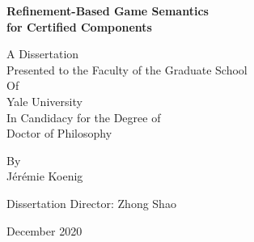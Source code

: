 \documentclass[11pt,oneside]{book}
\theoremstyle{definition}
\begin{document}






\begin{titlepage} %
  \large
  \centering

  \vspace*{2.5em}
  {\Large \bf Refinement-Based Game Semantics \\[0.5ex] for Certified Components}

  \vfill
  A Dissertation \\
  Presented to the Faculty of the Graduate School \\
  Of \\
  Yale University \\
  In Candidacy for the Degree of \\
  Doctor of Philosophy

  \vfill
  By \\
  J\'er\'emie Koenig

  \vspace{3.5em}
  Dissertation Director:
  Zhong Shao

  \vspace{3.5em}
  December 2020
\end{titlepage}
\end{document}
